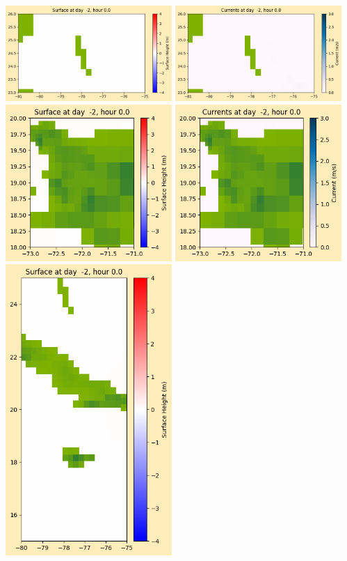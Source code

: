 \documentclass[11pt]{article}
\begin{document}
\vskip 10pt 
\includegraphics[width=0.475\textwidth]{frame0004fig1003.png}
\includegraphics[width=0.475\textwidth]{frame0004fig1004.png}
\vskip 10pt 
\includegraphics[width=0.475\textwidth]{frame0004fig1005.png}
\includegraphics[width=0.475\textwidth]{frame0004fig1006.png}
\vskip 10pt 
\includegraphics[width=0.475\textwidth]{frame0004fig1007.png}
\end{document}
